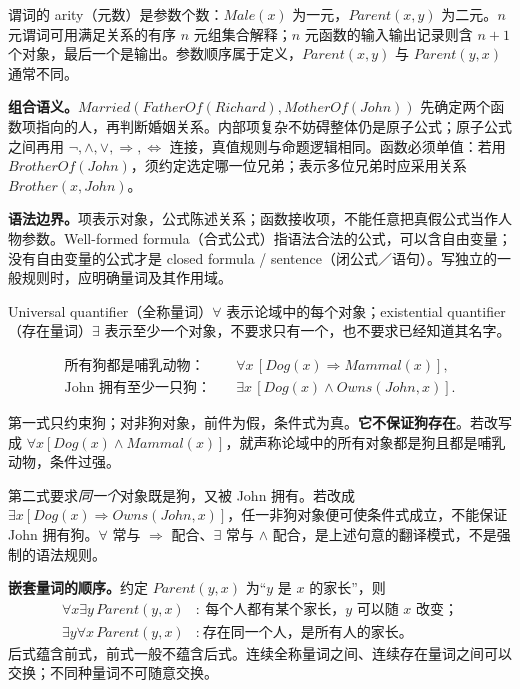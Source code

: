 谓词的 arity（元数）是参数个数：$Male(x)$ 为一元，$Parent(x,y)$ 为二元。$n$ 元谓词可用满足关系的有序 $n$ 元组集合解释；$n$ 元函数的输入输出记录则含 $n+1$ 个对象，最后一个是输出。参数顺序属于定义，$Parent(x,y)$ 与 $Parent(y,x)$ 通常不同。

\textbf{组合语义。}$Married(FatherOf(Richard),MotherOf(John))$ 先确定两个函数项指向的人，再判断婚姻关系。内部项复杂不妨碍整体仍是原子公式；原子公式之间再用 $\neg,\land,\lor,\Rightarrow,\Leftrightarrow$ 连接，真值规则与命题逻辑相同。函数必须单值：若用 $BrotherOf(John)$，须约定选定哪一位兄弟；表示多位兄弟时应采用关系 $Brother(x,John)$。

\textbf{语法边界。}项表示对象，公式陈述关系；函数接收项，不能任意把真假公式当作人物参数。Well-formed formula（合式公式）指语法合法的公式，可以含自由变量；没有自由变量的公式才是 closed formula / sentence（闭公式／语句）。写独立的一般规则时，应明确量词及其作用域。


Universal quantifier（全称量词）$\forall$ 表示论域中的每个对象；existential quantifier（存在量词）$\exists$ 表示至少一个对象，不要求只有一个，也不要求已经知道其名字。

\begin{align*}
 \text{所有狗都是哺乳动物：}\quad
 &\forall x\,[Dog(x)\Rightarrow Mammal(x)],\\
 \text{John 拥有至少一只狗：}\quad
 &\exists x\,[Dog(x)\land Owns(John,x)].
\end{align*}

第一式只约束狗；对非狗对象，前件为假，条件式为真。\textbf{它不保证狗存在}。若改写成 $\forall x[Dog(x)\land Mammal(x)]$，就声称论域中的所有对象都是狗且都是哺乳动物，条件过强。

第二式要求\emph{同一个}对象既是狗，又被 John 拥有。若改成 $\exists x[Dog(x)\Rightarrow Owns(John,x)]$，任一非狗对象便可使条件式成立，不能保证 John 拥有狗。$\forall$ 常与 $\Rightarrow$ 配合、$\exists$ 常与 $\land$ 配合，是上述句意的翻译模式，不是强制的语法规则。

\textbf{嵌套量词的顺序。}约定 $Parent(y,x)$ 为“$y$ 是 $x$ 的家长”，则
\begin{align*}
 \forall x\exists y\,Parent(y,x)
 &:\ \text{每个人都有某个家长，$y$ 可以随 $x$ 改变；}\\
 \exists y\forall x\,Parent(y,x)
 &:\ \text{存在同一个人，是所有人的家长。}
\end{align*}
后式蕴含前式，前式一般不蕴含后式。连续全称量词之间、连续存在量词之间可以交换；不同种量词不可随意交换。

